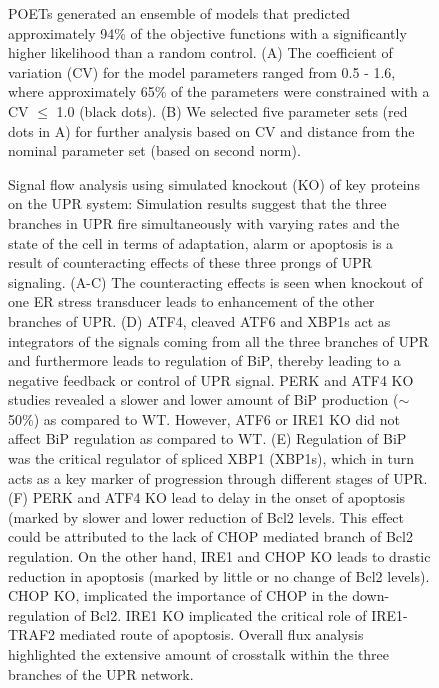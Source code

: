 \documentclass[fleqn,10pt]{wlscirep}
\begin{document}
\clearpage

\begin{figure}\centering
	\caption{ POETs generated an ensemble of models that predicted approximately 94\% of the objective functions with a significantly higher likelihood than a random control. (A) The coefficient of variation (CV) for the model parameters ranged from 0.5 - 1.6, where approximately 65\% of the parameters were constrained with a CV $\leq$ 1.0 (black dots). (B) We selected five parameter sets (red dots in A) for further analysis based on CV and distance from the nominal parameter set (based on second norm).}
	\label{fg:Para_S1}
\end{figure}

\begin{figure}\centering
	\caption{Signal flow analysis using simulated knockout (KO) of key proteins on the UPR system: Simulation results suggest that the three branches in UPR fire simultaneously with varying rates and the state of the cell in terms of adaptation, alarm or apoptosis is a result of counteracting effects of these three prongs of UPR signaling.
	(A-C) The counteracting effects is seen when knockout of one ER stress transducer leads to enhancement of the other branches of UPR.
	(D) ATF4, cleaved ATF6 and XBP1s act as integrators of the signals coming from all the three branches of UPR and furthermore leads to regulation of BiP, thereby leading to a negative feedback or control of UPR signal. PERK and ATF4 KO studies revealed a slower and lower amount of BiP production ($\sim$ 50\%) as compared to WT. However, ATF6 or IRE1 KO did not affect BiP regulation as compared to WT.
	(E) Regulation of BiP was the critical regulator of spliced XBP1 (XBP1s), which in turn acts as a key marker of progression through different stages of UPR.
	(F) PERK and ATF4 KO lead to delay in the onset of apoptosis (marked by slower and lower reduction of Bcl2 levels. This effect could be attributed to the lack of CHOP mediated branch of Bcl2 regulation. On the other hand, IRE1 and CHOP KO leads to drastic reduction in apoptosis (marked by little or no change of Bcl2 levels). CHOP KO, implicated the importance of CHOP in the down-regulation of Bcl2. IRE1 KO implicated the critical role of IRE1-TRAF2 mediated route of apoptosis.
Overall flux analysis highlighted the extensive amount of crosstalk within the three branches of the UPR network.}
\label{fg:Flux_Supp_Fig1}
\end{figure}
\end{document}
